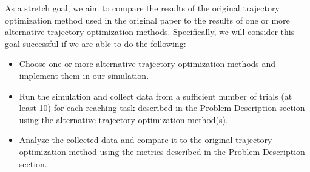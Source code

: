 \documentclass[table,12pt]{article}
\begin{document}
As a stretch goal, we aim to compare the results of the original trajectory optimization method used in the original paper to the results of one or more alternative trajectory optimization methods. Specifically, we will consider this goal successful if we are able to do the following:
\begin{itemize}
    \item Choose one or more alternative trajectory optimization methods and implement them in our simulation.
    \item Run the simulation and collect data from a sufficient number of trials (at least 10) for each reaching task described in the Problem Description section using the alternative trajectory optimization method(s).
    \item Analyze the collected data and compare it to the original trajectory optimization method using the metrics described in the Problem Description section.
\end{itemize}
\end{document}
